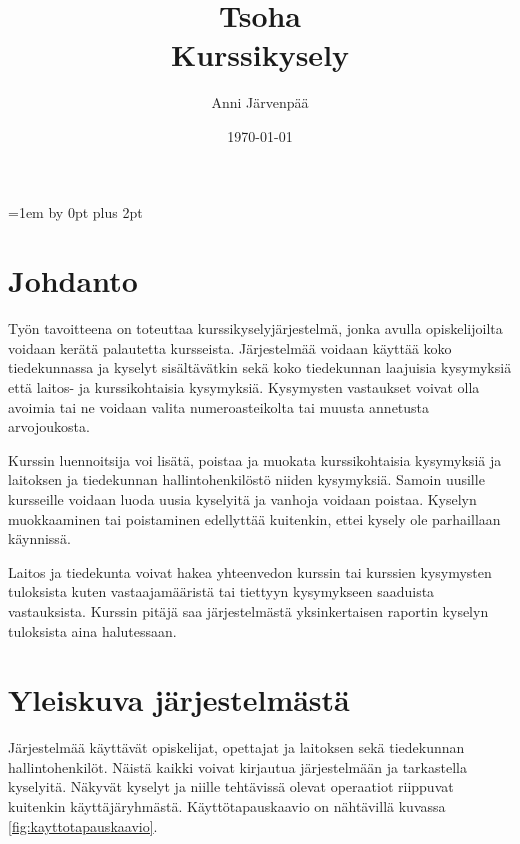 \documentclass[12pt,a4paper,titlepage]{article}
\title{Tsoha\\ Kurssikysely \vspace{0.5em}}
\author{Anni Järvenpää}
\date{\today}
\begin{document}
\maketitle

\newpage
\tableofcontents
\thispagestyle{empty}
\newpage
\setcounter{page}{1}
\parskip=1em \advance\parskip by 0pt plus 2pt
\pagestyle{fancy}
\cfoot{\thepage}

\section{Johdanto}
Työn tavoitteena on toteuttaa kurssikyselyjärjestelmä, jonka avulla opiskelijoilta voidaan kerätä palautetta kursseista. Järjestelmää voidaan käyttää koko tiedekunnassa ja kyselyt sisältävätkin sekä koko tiedekunnan laajuisia kysymyksiä että laitos- ja kurssikohtaisia kysymyksiä. Kysymysten vastaukset voivat olla avoimia tai ne voidaan valita numeroasteikolta tai muusta annetusta arvojoukosta.

Kurssin luennoitsija voi lisätä, poistaa ja muokata kurssikohtaisia kysymyksiä ja laitoksen ja tiedekunnan hallintohenkilöstö niiden kysymyksiä. Samoin uusille kursseille voidaan luoda uusia kyselyitä ja vanhoja voidaan poistaa. Kyselyn muokkaaminen tai poistaminen edellyttää kuitenkin, ettei kysely ole parhaillaan käynnissä.

Laitos ja tiedekunta voivat hakea yhteenvedon kurssin tai kurssien kysymysten tuloksista kuten vastaajamääristä tai tiettyyn kysymykseen saaduista vastauksista. Kurssin pitäjä saa järjestelmästä yksinkertaisen raportin kyselyn tuloksista aina halutessaan.


\section{Yleiskuva järjestelmästä}
Järjestelmää käyttävät opiskelijat, opettajat ja laitoksen sekä tiedekunnan hallintohenkilöt. Näistä kaikki voivat kirjautua järjestelmään ja tarkastella kyselyitä. Näkyvät kyselyt ja niille tehtävissä olevat operaatiot riippuvat kuitenkin käyttäjäryhmästä. Käyttö\-tapaus\-kaavio on nähtävillä kuvassa \ref{fig:kayttotapauskaavio}.
\end{document}
